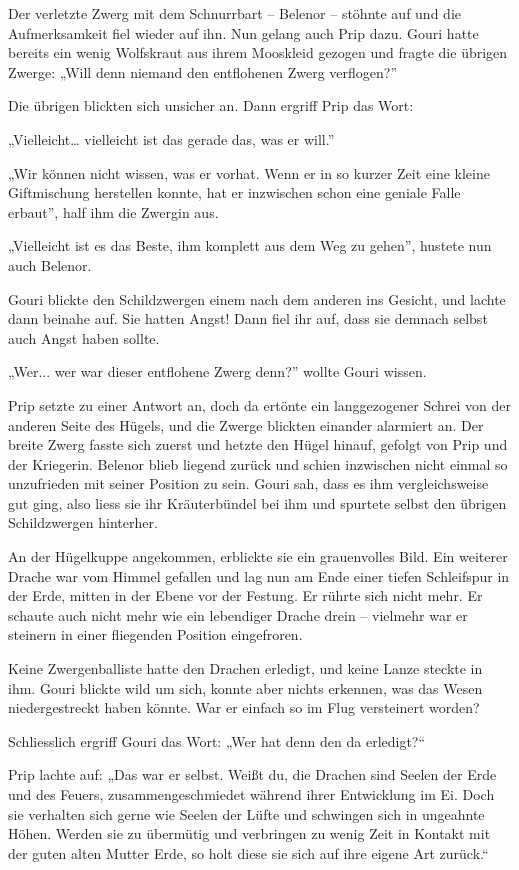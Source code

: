 \documentclass[10pt, a4paper, oneside]{book}
\begin{document}
Der verletzte Zwerg mit dem Schnurrbart – Belenor – stöhnte auf und die Aufmerksamkeit fiel wieder auf ihn. Nun gelang auch Prip dazu. Gouri hatte bereits ein wenig Wolfskraut aus ihrem Mooskleid gezogen und fragte die übrigen Zwerge: „Will denn niemand den entflohenen Zwerg verflogen?”

Die übrigen blickten sich unsicher an. Dann ergriff Prip das Wort:

„Vielleicht… vielleicht ist das gerade das, was er will.”

„Wir können nicht wissen, was er vorhat. Wenn er in so kurzer Zeit eine kleine Giftmischung herstellen konnte, hat er inzwischen schon eine geniale Falle erbaut”, half ihm die Zwergin aus.

„Vielleicht ist es das Beste, ihm komplett aus dem Weg zu gehen”, hustete nun auch Belenor.

Gouri blickte den Schildzwergen einem nach dem anderen ins Gesicht, und lachte dann beinahe auf. Sie hatten Angst! Dann fiel ihr auf, dass sie demnach selbst auch Angst haben sollte.

„Wer... wer war dieser entflohene Zwerg denn?” wollte Gouri wissen.

Prip setzte zu einer Antwort an, doch da ertönte ein langgezogener Schrei von der anderen Seite des Hügels, und die Zwerge blickten einander alarmiert an. Der breite Zwerg fasste sich zuerst und hetzte den Hügel hinauf, gefolgt von Prip und der Kriegerin. Belenor blieb liegend zurück und schien inzwischen nicht einmal so unzufrieden mit seiner Position zu sein. Gouri sah, dass es ihm vergleichsweise gut ging, also liess sie ihr Kräuterbündel bei ihm und spurtete selbst den übrigen Schildzwergen hinterher.

An der Hügelkuppe angekommen, erblickte sie ein grauenvolles Bild. Ein weiterer Drache war vom Himmel gefallen und lag nun am Ende einer tiefen Schleifspur in der Erde, mitten in der Ebene vor der Festung. Er rührte sich nicht mehr. Er schaute auch nicht mehr wie ein lebendiger Drache drein – vielmehr war er steinern in einer fliegenden Position eingefroren.

Keine Zwergenballiste hatte den Drachen erledigt, und keine Lanze steckte in ihm. Gouri blickte wild um sich, konnte aber nichts erkennen, was das Wesen niedergestreckt haben könnte. War er einfach so im Flug versteinert worden?

Schliesslich ergriff Gouri das Wort: „Wer hat denn den da erledigt?“

Prip lachte auf: „Das war er selbst. Weißt du, die Drachen sind Seelen der Erde und des Feuers, zusammengeschmiedet während ihrer Entwicklung im Ei. Doch sie verhalten sich gerne wie Seelen der Lüfte und schwingen sich in ungeahnte Höhen. Werden sie zu übermütig und verbringen zu wenig Zeit in Kontakt mit der guten alten Mutter Erde, so holt diese sie sich auf ihre eigene Art zurück.“
\end{document}
